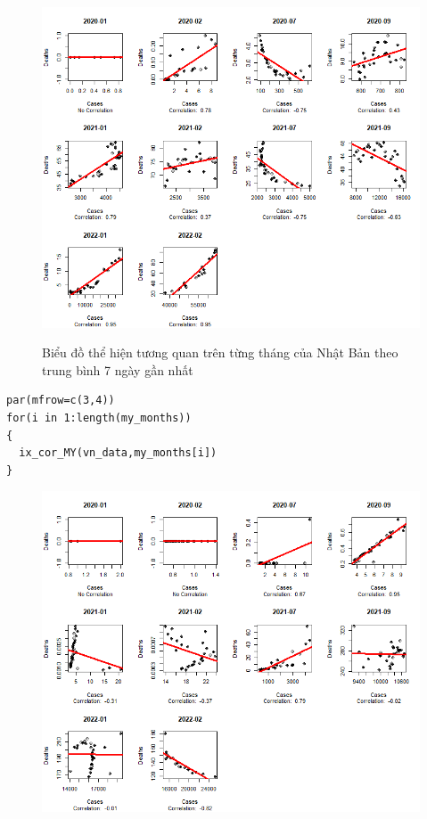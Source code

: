 \documentclass[a4paper]{article}
\theoremstyle{definition}
\begin{document}
\begin{enumerate}[i)]
\begin{enumerate}[1)]
\begin{figure}[h!]
\begin{center}
	    \includegraphics[scale=0.8]{Images/IV/Japan (avg7).png}
	    \label{fig:my_label}
	\end{center}
\end{figure}
\begin{figure}[h!]
    \begin{center}
	    \caption{Biểu đồ thể hiện tương quan trên từng tháng của Nhật Bản theo trung bình 7 ngày gần nhất}
	\end{center}
\end{figure}
\newpage
\lstset{
    title=Source code for Vietnam}
\begin{lstlisting}[frame=single]  
par(mfrow=c(3,4))
for(i in 1:length(my_months))
{
  ix_cor_MY(vn_data,my_months[i])
}
\end{lstlisting}
\begin{figure}[h!]
	\begin{center}
	    \includegraphics[scale=0.8]{Images/IV/Vietnam (avg7).png}

\end{center}
\end{figure}
\end{enumerate}
\end{enumerate}
\end{document}
